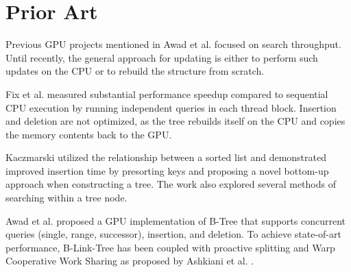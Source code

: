\section{Prior Art}

Previous GPU projects mentioned in Awad et al. \cite{awad} focused on search throughput. Until recently, the general approach for updating is either to perform such updates on the CPU or to rebuild the structure from scratch.

Fix et al. \cite{fix2011accelerating} measured substantial performance speedup compared to sequential CPU execution by running independent queries in each thread block. Insertion and deletion are not optimized, as the tree rebuilds itself on the CPU and copies the memory contents back to the GPU.

Kaczmarski \cite{kaczmarski} utilized the relationship between a sorted list and demonstrated improved insertion time by presorting keys and proposing a novel bottom-up approach when constructing a tree. The work also explored several methods of searching within a tree node.

Awad et al. \cite{awad} proposed a GPU implementation of B-Tree that supports concurrent queries (single, range, successor), insertion, and deletion. To achieve state-of-art performance, B-Link-Tree has been coupled with proactive splitting and Warp Cooperative Work Sharing as proposed by Ashkiani et al. \cite{ashkiani2018dynamic}.


